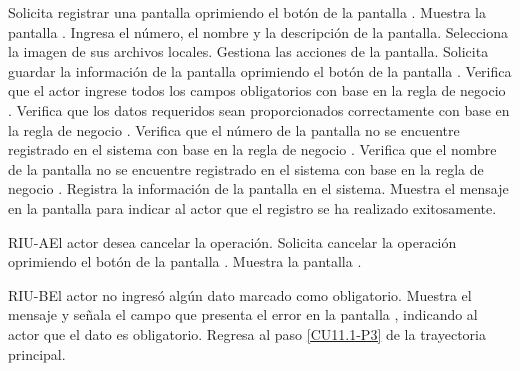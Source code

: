 	\begin{UCtrayectoria}
		\UCpaso[\UCactor] Solicita registrar una pantalla oprimiendo el botón  de la pantalla .
		\UCpaso[\UCsist] Muestra la pantalla .
		\UCpaso[\UCactor] Ingresa el número, el nombre y la descripción de la pantalla. \label{CU11.1-P3}
		\UCpaso[\UCactor] Selecciona la imagen de sus archivos locales. \label{CU11.1-P4}
		\UCpaso[\UCactor] Gestiona las acciones de la pantalla. \label{CU11.1-P5}
		\UCpaso[\UCactor] Solicita guardar la información de la pantalla oprimiendo el botón  de la pantalla . 
		\UCpaso[\UCsist] Verifica que el actor ingrese todos los campos obligatorios con base en la regla de negocio . 
		\UCpaso[\UCsist] Verifica que los datos requeridos sean proporcionados correctamente con base en la regla de negocio .     
		\UCpaso[\UCsist] Verifica que el número de la pantalla no se encuentre registrado en el sistema con base en la regla de negocio . 
		\UCpaso[\UCsist] Verifica que el nombre de la pantalla no se encuentre registrado en el sistema con base en la regla de negocio .  
		\UCpaso[\UCsist] Registra la información de la pantalla en el sistema.
		\UCpaso[\UCsist] Muestra el mensaje  en la pantalla  para indicar al actor que el registro se ha realizado exitosamente.
	\end{UCtrayectoria}		

	\begin{UCtrayectoriaA}{RIU-A}{El actor desea cancelar la operación.}
		\UCpaso[\UCactor] Solicita cancelar la operación oprimiendo el botón  de la pantalla .
		\UCpaso[\UCsist] Muestra la pantalla .
	\end{UCtrayectoriaA}

	\begin{UCtrayectoriaA}{RIU-B}{El actor no ingresó algún dato marcado como obligatorio.}
		\UCpaso[\UCsist] Muestra el mensaje  y señala el campo que presenta el error en la pantalla , indicando al actor que el dato es obligatorio.
		\UCpaso Regresa al paso \ref{CU11.1-P3} de la trayectoria principal.
	\end{UCtrayectoriaA}

